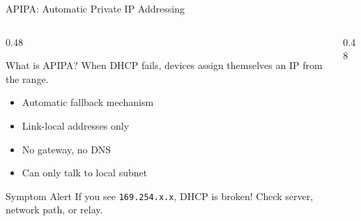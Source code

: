 \documentclass[aspectratio=169]{beamer}  %
\begin{document}
\begin{frame}{APIPA: Automatic Private IP Addressing}
    \begin{columns}[T]
        \begin{column}{0.48\textwidth}
            \begin{block}{What is APIPA?}
                \small
                When DHCP fails, devices assign themselves an IP from the  range.
                
                \vspace{0.2em}
                \begin{itemize}\setlength{\itemsep}{1pt}
                    \item Automatic fallback mechanism
                    \item Link-local addresses only
                    \item No gateway, no DNS
                    \item Can only talk to local subnet
                \end{itemize}
            \end{block}
            
            \vspace{0.2em}
            \begin{alertblock}{Symptom Alert}
                \small
                If you see \texttt{169.254.x.x}, DHCP is broken! Check server, network path, or relay.
            \end{alertblock}
        \end{column}
        \begin{column}{0.48\textwidth}
            \begin{center}
\end{center}
\end{column}
\end{columns}
\end{frame}
\end{document}
